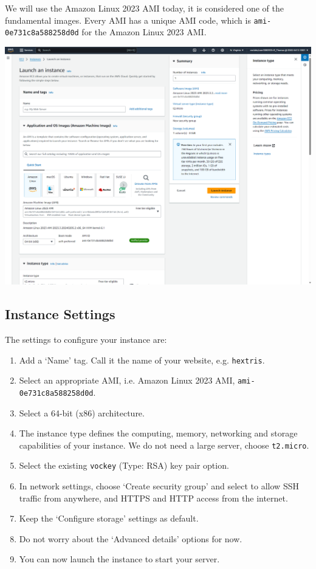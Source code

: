 \documentclass{csse4400}
\begin{document}
We will use the Amazon Linux 2023 AMI today,
it is considered one of the fundamental images.
Every AMI has a unique AMI code,
which is \texttt{ami-0e731c8a588258d0d} for the Amazon Linux 2023 AMI.

\vspace{4mm}
\noindent
\includegraphics[width=\textwidth]{images/launch-instance}


\subsection{Instance Settings}
The settings to configure your instance are:
\begin{enumerate}
\item Add a `Name' tag. Call it the name of your website, e.g. \texttt{hextris}.
\item Select an appropriate AMI, i.e. Amazon Linux 2023 AMI, \texttt{ami-0e731c8a588258d0d}.
\item Select a 64-bit (x86) architecture.
\item The instance type defines the computing, memory, networking and storage capabilities of your instance. We do not need a large server, choose \texttt{t2.micro}.
\item Select the existing \texttt{vockey} (Type: RSA) key pair option.
\item In network settings, choose `Create security group' and select to allow SSH traffic from anywhere, and HTTPS and HTTP access from the internet.
\item Keep the `Configure storage' settings as default.
\item Do not worry about the `Advanced details' options for now.
\item You can now launch the instance to start your server.
\end{enumerate}
\end{document}
